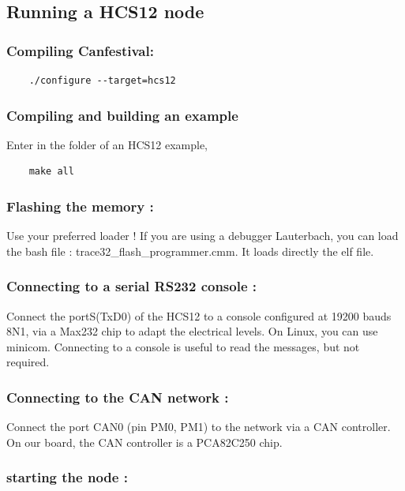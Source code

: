 \documentclass[12pt,english,a4paper]{book}
\begin{document}
\subsection{Running a HCS12 node}


\subsubsection{Compiling Canfestival:}

\begin{verbatim}
	./configure --target=hcs12
\end{verbatim}


\subsubsection{Compiling and building an example}

Enter in the folder of an HCS12 example,

\begin{verbatim}
	make all
\end{verbatim}


\subsubsection{Flashing the memory :}

Use your preferred loader ! If you are using a debugger Lauterbach,
you can load the bash file : trace32\_flash\_programmer.cmm. It loads
directly the elf file.


\subsubsection{Connecting to a serial RS232 console :}

Connect the portS(TxD0) of the HCS12 to a console configured at 19200
bauds 8N1, via a Max232 chip to adapt the electrical levels. On Linux,
you can use minicom. Connecting to a console is useful to read the
messages, but not required.


\subsubsection{Connecting to the CAN network :}

Connect the port CAN0 (pin PM0, PM1) to the network via a CAN controller.
On our board, the CAN controller is a PCA82C250 chip.


\subsubsection{starting the node :}
\end{document}
